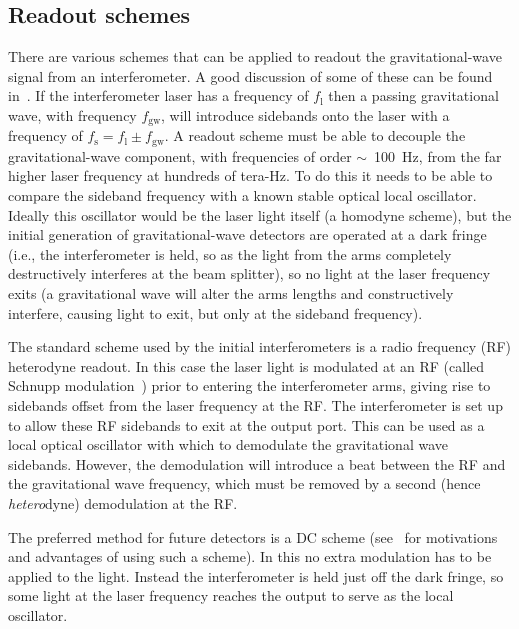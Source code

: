 \documentclass{article}
\begin{document}
\subsection{Readout schemes}
\label{sec:readout}

There are various schemes that can be applied to readout the
gravitational-wave signal from an interferometer. A good discussion of
some of these can be found in~\cite{Hild:2009}. If the interferometer
laser has a frequency of $f_{\mathrm{l}}$ then a passing
gravitational wave, with frequency $f_{\mathrm{gw}}$, will introduce
sidebands onto the laser with a frequency of $f_{\mathrm{s}} =
f_{\mathrm{l}} \pm f_{\mathrm{gw}}$. A readout scheme must be able to
decouple the gravitational-wave component, with frequencies of order
$\sim$~100~Hz, from the far higher laser frequency at hundreds of
tera-Hz. To do this it needs to be able to compare the sideband
frequency with a known stable optical local oscillator. Ideally this
oscillator would be the laser light itself (a homodyne scheme), but
the initial generation of gravitational-wave detectors are operated at
a dark fringe (i.e., the interferometer is held, so as the light from
the arms completely destructively interferes at the beam splitter), so
no light at the laser frequency exits (a gravitational wave will alter
the arms lengths and constructively interfere, causing light to exit,
but only at the sideband frequency).

The standard scheme used by the initial interferometers is a radio frequency (RF) heterodyne
readout. In this case the laser light is modulated at an RF
(called Schnupp modulation~\cite{Schnupp:1988}) prior to entering the
interferometer arms, giving rise to sidebands offset from the laser frequency at
the RF. The interferometer is set up to allow these RF sidebands to exit at
the output port. This can be used as a local optical oscillator with which to
demodulate the gravitational wave sidebands. However, the demodulation will
introduce a beat between the RF and the gravitational wave frequency, which must
be removed by a second (hence \textit{hetero}dyne) demodulation at the RF.

The preferred method for future detectors is a DC scheme
(see~\cite{Fritschel:2003, Ward:2008, Hild:2009} for motivations and
advantages of using such a scheme). In this no extra modulation has to
be applied to the light. Instead the interferometer is held just off
the dark fringe, so some light at the laser frequency reaches the
output to serve as the local oscillator.
\end{document}
